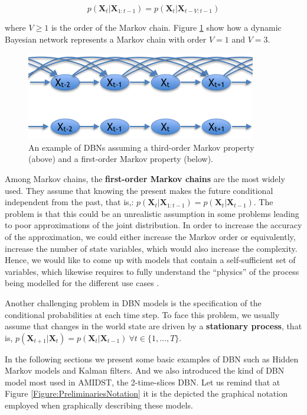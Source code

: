 $$p(\bm X_t| \bm X_{1:t-1})  = p(\bm X_t|\bm X_{t-V:t-1})$$

\noindent where $V\geq 1$ is the order of the Markov chain.   Figure \ref{Figure:markovChain} show how a dynamic Bayesian network represents a Markov chain with order $V=1$ and $V=3$. 


\begin{figure}[ht!]
\begin{center}
\includegraphics[scale=0.56]{./figures/PreliminariesMarkovChain}
\caption{\label{Figure:markovChain} An example of DBNs assuming a third-order Markov property (above) and a first-order Markov property (below).
}
\end{center}
\end{figure}

Among Markov chains, the \textbf{first-order Markov chains} are the most widely used. They assume that knowing the present makes the future conditional independent from the past, that is,: $p(\bm X_t| \bm X_{1:t-1})  = p(\bm X_t|\bm X_{t-1})$. The problem is that this could be an unrealistic assumption in some problems leading to poor approximations of the joint distribution. In order to increase the accuracy of the approximation, we could either increase the Markov order or equivalently, increase the number of state variables, which would also increase the complexity. Hence, we would like to come up with models that contain a self-sufficient set of variables, which likewise requires to fully understand the ``physics''  of the process being modelled for the different use cases \cite{russelNorvig2009}. 

Another challenging problem in  DBN models is the specification of the conditional probabilities at each time step. To face this problem, we usually assume that changes in the world state are driven by a \textbf{stationary process}, that is, $p(\bm X_{t+1}|\bm X_{t}) = p(\bm X_t|\bm X_{t-1})\ \forall t \in\{1,\ldots,T\}$. 



In the following sections we present some basic examples of DBN such as Hidden Markov models and Kalman filters. And we also introduced the kind of DBN model most used in AMIDST, the 2-time-slices DBN. Let us remind that at Figure \ref{Figure:PreliminariesNotation} it is the depicted the graphical notation employed when graphically describing these models.


